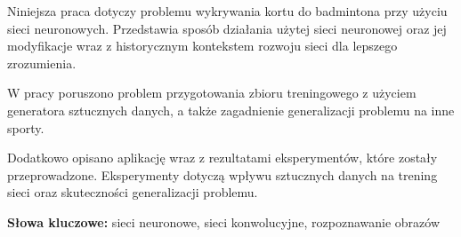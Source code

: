 
Niniejsza praca dotyczy problemu wykrywania kortu do badmintona przy użyciu sieci neuronowych.
Przedstawia sposób działania użytej sieci neuronowej oraz jej modyfikacje wraz z historycznym kontekstem rozwoju sieci dla lepszego zrozumienia. 

W pracy poruszono problem przygotowania zbioru treningowego z użyciem generatora sztucznych danych, a także zagadnienie generalizacji problemu na inne sporty.

Dodatkowo opisano aplikację wraz z rezultatami eksperymentów, które zostały przeprowadzone.
Eksperymenty dotyczą wpływu sztucznych danych na trening sieci oraz skuteczności generalizacji problemu. \\


\noindent \textbf{Słowa kluczowe:} sieci neuronowe, sieci konwolucyjne, rozpoznawanie obrazów
